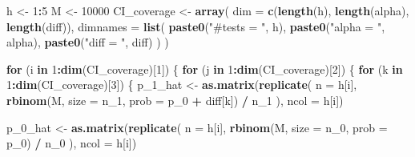 \documentclass[
]{article}
\newenvironment{Shaded}{\begin{snugshade}}{\end{snugshade}}
\newcommand{\ControlFlowTok}[1]{\textcolor[rgb]{0.13,0.29,0.53}{\textbf{#1}}}
\newcommand{\DataTypeTok}[1]{\textcolor[rgb]{0.13,0.29,0.53}{#1}}
\newcommand{\DecValTok}[1]{\textcolor[rgb]{0.00,0.00,0.81}{#1}}
\newcommand{\KeywordTok}[1]{\textcolor[rgb]{0.13,0.29,0.53}{\textbf{#1}}}
\newcommand{\NormalTok}[1]{#1}
\newcommand{\OperatorTok}[1]{\textcolor[rgb]{0.81,0.36,0.00}{\textbf{#1}}}
\newcommand{\StringTok}[1]{\textcolor[rgb]{0.31,0.60,0.02}{#1}}
\begin{document}
\begin{Shaded}
\begin{Highlighting}[]
\NormalTok{h <-}\StringTok{ }\DecValTok{1}\OperatorTok{:}\DecValTok{5}
\NormalTok{M <-}\StringTok{ }\DecValTok{10000}
\NormalTok{CI_coverage <-}\StringTok{ }\KeywordTok{array}\NormalTok{(}
  \DataTypeTok{dim =} \KeywordTok{c}\NormalTok{(}\KeywordTok{length}\NormalTok{(h), }\KeywordTok{length}\NormalTok{(alpha), }\KeywordTok{length}\NormalTok{(diff)),}
  \DataTypeTok{dimnames =} \KeywordTok{list}\NormalTok{(}
    \KeywordTok{paste0}\NormalTok{(}\StringTok{"#tests = "}\NormalTok{, h), }\KeywordTok{paste0}\NormalTok{(}\StringTok{"alpha = "}\NormalTok{, alpha),}
    \KeywordTok{paste0}\NormalTok{(}\StringTok{"diff = "}\NormalTok{, diff)}
\NormalTok{  )}
\NormalTok{)}

\ControlFlowTok{for}\NormalTok{ (i }\ControlFlowTok{in} \DecValTok{1}\OperatorTok{:}\KeywordTok{dim}\NormalTok{(CI_coverage)[}\DecValTok{1}\NormalTok{]) \{}
  \ControlFlowTok{for}\NormalTok{ (j }\ControlFlowTok{in} \DecValTok{1}\OperatorTok{:}\KeywordTok{dim}\NormalTok{(CI_coverage)[}\DecValTok{2}\NormalTok{]) \{}
    \ControlFlowTok{for}\NormalTok{ (k }\ControlFlowTok{in} \DecValTok{1}\OperatorTok{:}\KeywordTok{dim}\NormalTok{(CI_coverage)[}\DecValTok{3}\NormalTok{]) \{}
\NormalTok{      p_}\DecValTok{1}\NormalTok{_hat <-}\StringTok{ }\KeywordTok{as.matrix}\NormalTok{(}\KeywordTok{replicate}\NormalTok{(}
        \DataTypeTok{n =}\NormalTok{ h[i],}
        \KeywordTok{rbinom}\NormalTok{(M, }\DataTypeTok{size =}\NormalTok{ n_}\DecValTok{1}\NormalTok{, }\DataTypeTok{prob =}\NormalTok{ p_}\DecValTok{0} \OperatorTok{+}\StringTok{ }\NormalTok{diff[k]) }\OperatorTok{/}\StringTok{ }\NormalTok{n_}\DecValTok{1}
\NormalTok{      ), }\DataTypeTok{ncol =}\NormalTok{ h[i])}

\NormalTok{      p_}\DecValTok{0}\NormalTok{_hat <-}\StringTok{ }\KeywordTok{as.matrix}\NormalTok{(}\KeywordTok{replicate}\NormalTok{(}
        \DataTypeTok{n =}\NormalTok{ h[i],}
        \KeywordTok{rbinom}\NormalTok{(M, }\DataTypeTok{size =}\NormalTok{ n_}\DecValTok{0}\NormalTok{, }\DataTypeTok{prob =}\NormalTok{ p_}\DecValTok{0}\NormalTok{) }\OperatorTok{/}\StringTok{ }\NormalTok{n_}\DecValTok{0}
\NormalTok{      ), }\DataTypeTok{ncol =}\NormalTok{ h[i])}


\end{Highlighting}
\end{Shaded}
\end{document}
